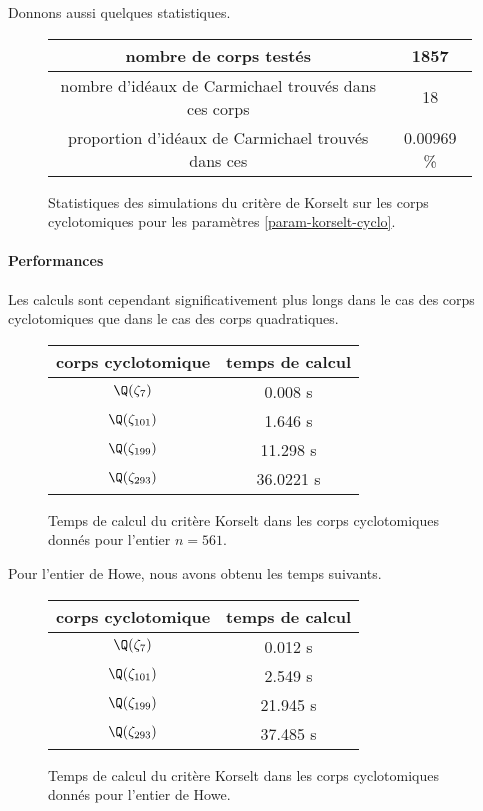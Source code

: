 Donnons aussi quelques statistiques.

\begin{figure}[h!]
	\begin{center}
		\begin{tabular}{|c|c|}
			\hline
			nombre de corps testés & 1857 \\\hline
			nombre d'idéaux de Carmichael trouvés dans ces corps & 18 \\\hline
			proportion d'idéaux de Carmichael trouvés dans ces & 0.00969 \% \\\hline
		\end{tabular}
		\caption{Statistiques des simulations du critère de Korselt sur les corps cyclotomiques pour les paramètres \ref{param-korselt-cyclo}.}
	\end{center}
\end{figure}

\paragraph{Performances}

Les calculs sont cependant significativement plus longs dans le cas des corps cyclotomiques que dans le cas des corps quadratiques.  

\begin{figure}[h!]
	\begin{center}
		\begin{tabular}{|c|c|}
			\hline
			corps cyclotomique & temps de calcul \\
			\hline
			\hline
			$\Q(\zeta_7)$ & 0.008 s \\\hline
			$\Q(\zeta_{101})$ & 1.646 s \\\hline
			$\Q(\zeta_{199})$ & 11.298 s \\\hline
			$\Q(\zeta_{293})$ & 36.0221 s \\\hline
		\end{tabular}
		\caption{Temps de calcul du critère Korselt dans les corps cyclotomiques donnés pour l'entier $n=561$.}
	\end{center}
\end{figure}

Pour l'entier de Howe, nous avons obtenu les temps suivants.

\begin{figure}[h!]
	\begin{center}
		\begin{tabular}{|c|c|}
			\hline
			corps cyclotomique & temps de calcul \\
			\hline
			\hline
			$\Q(\zeta_7)$ & 0.012 s \\\hline
			$\Q(\zeta_{101})$ & 2.549 s \\\hline
			$\Q(\zeta_{199})$ & 21.945 s \\\hline
			$\Q(\zeta_{293})$ & 37.485 s \\\hline
		\end{tabular}
		\caption{Temps de calcul du critère Korselt dans les corps cyclotomiques donnés pour l'entier de Howe.}
	\end{center}
\end{figure}
